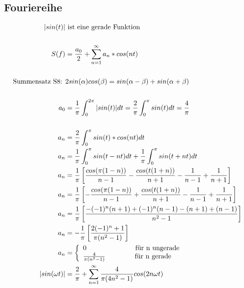 \subsection{Fouriereihe}
\begin{center}
  \begin{align*}
    |sin(t)| & \text{ ist eine gerade Funktion} \\ \\
    S(f) &= \frac{a_0}{2} + \sum_{n=1}^{\infty} a_n * cos(nt) \\ \\
    \text{Summensatz S8: } & 2sin(\alpha)cos(\beta) = sin(\alpha-\beta)+sin(\alpha+\beta) \\ \\
    a_0 &= \frac{1}{\pi}\int_0^{2\pi} |sin(t)| dt = \frac{2}{\pi}\int_0^{\pi} sin(t) dt = \frac{4}{\pi} \\ \\
    a_n &= \frac{2}{\pi}\int_0^{\pi} sin(t) * cos (nt) dt \\
    a_n &= \frac{1}{\pi}\int_0^{\pi} sin(t - nt) dt +  \frac{1}{\pi}\int_0^{\pi} sin(t + nt) dt\\
    a_n &= \frac{1}{\pi} \left[ \frac{cos(\pi(1-n))}{n-1} - \frac{cos(t(1+n))}{n+1} - \frac{1}{n-1} + \frac{1}{n+1} \right] \\
    a_n &= \frac{1}{\pi} \left[ -\frac{cos(\pi(1-n))}{n-1} + \frac{cos(t(1+n))}{n+1} - \frac{1}{n-1} + \frac{1}{n+1} \right] \\
    a_n &= \frac{1}{\pi} \left[ \frac{-(-1)^n (n+1) + (-1)^n (n-1) - (n+1) + (n-1)}{n^2-1} \right] \\
    a_n &= -\frac{1}{\pi} \left[ \frac{2(-1)^n + 1}{\pi(n^2-1)} \right] \\
    a_n &= \left\{\begin{array}{ll}
            0                     \hspace{2.5cm} \text{f\"ur n ungerade}\\
            \frac{4}{\pi(n^2-1)} \hspace{1.5cm} \text{f\"ur n gerade}
            \end{array}\right. \\
    |sin(\omega t)| &= \frac{2}{\pi} + \sum_{n=1}^{\infty}\frac{4}{\pi(4n^2-1)} cos(2n\omega t)
  \end{align*}
\end{center}

